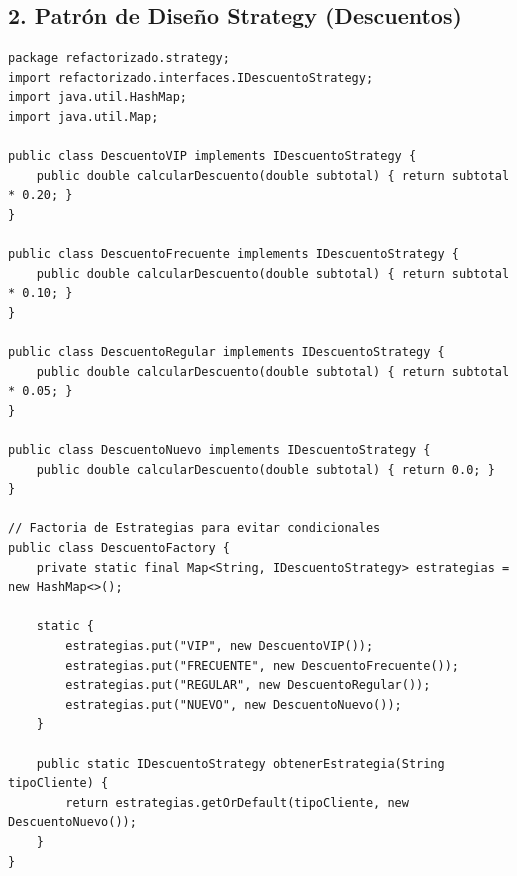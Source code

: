 \documentclass[12pt, a4paper]{article}
\begin{document}
\subsection{2. Patrón de Diseño Strategy (Descuentos)}
\begin{lstlisting}[caption={Estrategias de Descuento (SOLID OCP)}, label={lst:strategy}]
package refactorizado.strategy;
import refactorizado.interfaces.IDescuentoStrategy;
import java.util.HashMap;
import java.util.Map;

public class DescuentoVIP implements IDescuentoStrategy {
    public double calcularDescuento(double subtotal) { return subtotal * 0.20; }
}

public class DescuentoFrecuente implements IDescuentoStrategy {
    public double calcularDescuento(double subtotal) { return subtotal * 0.10; }
}

public class DescuentoRegular implements IDescuentoStrategy {
    public double calcularDescuento(double subtotal) { return subtotal * 0.05; }
}

public class DescuentoNuevo implements IDescuentoStrategy {
    public double calcularDescuento(double subtotal) { return 0.0; }
}

// Factoria de Estrategias para evitar condicionales
public class DescuentoFactory {
    private static final Map<String, IDescuentoStrategy> estrategias = new HashMap<>();

    static {
        estrategias.put("VIP", new DescuentoVIP());
        estrategias.put("FRECUENTE", new DescuentoFrecuente());
        estrategias.put("REGULAR", new DescuentoRegular());
        estrategias.put("NUEVO", new DescuentoNuevo());
    }

    public static IDescuentoStrategy obtenerEstrategia(String tipoCliente) {
        return estrategias.getOrDefault(tipoCliente, new DescuentoNuevo());
    }
}
\end{lstlisting}

\newpage
\end{document}
